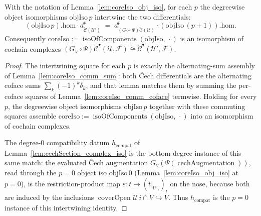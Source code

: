 \begin{lemma}

  \label{lem:coreIso_comm}
  With the notation of Lemma~\ref{lem:coreIso_obj_iso}, for each \(p\) the degreewise object
  isomorphisms \(\mathrm{objIso}\,p\) intertwine the two differentials:
  \[
    (\mathrm{objIso}\,p).\mathrm{hom} \cdot
      d^{p}_{\check{\mathcal{C}}(\mathcal{U}')}
      \;=\;
    d^{p}_{(G_V\circ\Psi)\check{\mathcal{C}}(\mathcal{U})} \cdot
      (\mathrm{objIso}\,(p+1)).\mathrm{hom}.
  \]
  Consequently \(\mathrm{coreIso} := \operatorname{isoOfComponents}(\mathrm{objIso},\,\cdot)\)
  is an isomorphism of cochain complexes \((G_V\circ\Psi)\check{\mathcal{C}}^\bullet(\mathcal{U},
  \mathcal{F}) \cong \check{\mathcal{C}}^\bullet(\mathcal{U}', \mathcal{F})\).
\end{lemma}
\begin{proof}
  \leanok
  The intertwining square for each \(p\) is exactly the alternating-sum assembly of
  Lemma~\ref{lem:coreIso_comm_sum}: both {\v C}ech differentials are the alternating coface sums
  \(\sum_k (-1)^k \delta_k\), and that lemma matches them by summing the per-coface squares of
  Lemma~\ref{lem:coreIso_comm_coface} termwise. Holding for every \(p\), the degreewise object
  isomorphisms \(\mathrm{objIso}\,p\) together with these commuting squares assemble
  \(\mathrm{coreIso} := \operatorname{isoOfComponents}(\mathrm{objIso},\,\cdot)\) into an
  isomorphism of cochain complexes.

  The degree-\(0\) compatibility datum \(h_{\mathrm{compat}}\) of
  Lemma~\ref{lem:cechSection_complex_iso} is the bottom-degree instance of this same match: the
  evaluated {\v C}ech augmentation \(G_V(\Psi(\operatorname{cechAugmentation}))\), read through
  the \(p=0\) object iso \(\mathrm{objIso}\,0\) (Lemma~\ref{lem:coreIso_obj_iso} at \(p=0\)), is
  the restriction-product map \(\varepsilon\colon t \mapsto (t|_{U'_i})_i\) on the nose, because
  both are induced by the inclusions \(\operatorname{coverOpen}\mathcal{U}\,i \cap V
  \hookrightarrow V\). Thus \(h_{\mathrm{compat}}\) is the \(p=0\) instance of this intertwining
  identity.
\end{proof}

